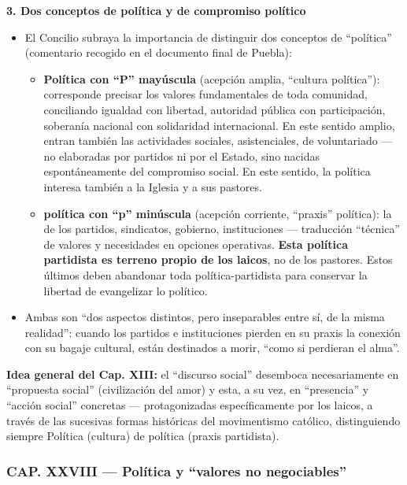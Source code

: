 \documentclass[10pt,a4paper]{article}
\begin{document}
\medskip\noindent \textbf{3. Dos conceptos de política y de compromiso político}\par\nopagebreak
\begin{itemize}
\item El Concilio subraya la importancia de distinguir dos conceptos de ``política'' (comentario recogido en el documento final de Puebla):
\begin{itemize}
\item \textbf{Política con ``P'' mayúscula} (acepción amplia, ``cultura política''): corresponde precisar los valores fundamentales de toda comunidad, conciliando igualdad con libertad, autoridad pública con participación, soberanía nacional con solidaridad internacional. En este sentido amplio, entran también las actividades sociales, asistenciales, de voluntariado --- no elaboradas por partidos ni por el Estado, sino nacidas espontáneamente del compromiso social. En este sentido, la política interesa también a la Iglesia y a sus pastores.
\item \textbf{política con ``p'' minúscula} (acepción corriente, ``praxis'' política): la de los partidos, sindicatos, gobierno, instituciones --- traducción ``técnica'' de valores y necesidades en opciones operativas. \textbf{Esta política partidista es terreno propio de los laicos}, no de los pastores. Estos últimos deben abandonar toda política-partidista para conservar la libertad de evangelizar lo político.
\end{itemize}
\item Ambas son ``dos aspectos distintos, pero inseparables entre sí, de la misma realidad'': cuando los partidos e instituciones pierden en su praxis la conexión con su bagaje cultural, están destinados a morir, ``como si perdieran el alma''.
\end{itemize}

\noindent \textbf{Idea general del Cap. XIII:} el ``discurso social'' desemboca necesariamente en ``propuesta social'' (civilización del amor) y esta, a su vez, en ``presencia'' y ``acción social'' concretas --- protagonizadas específicamente por los laicos, a través de las sucesivas formas históricas del movimentismo católico, distinguiendo siempre Política (cultura) de política (praxis partidista).\par\smallskip



\subsubsection{CAP. XXVIII --- Política y ``valores no negociables''}
\end{document}
